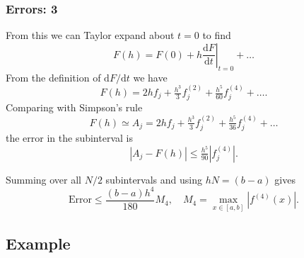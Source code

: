 \documentclass{beamer}
\begin{document}
\begin{frame}
  \frametitle{Errors: 3}

  From this we can Taylor expand about $t=0$ to find
  \begin{equation*}
    F(h) = F(0) + h \left. \frac{\text{d}F}{\text{d}t} \right|_{t=0}
    + \dots
  \end{equation*} \pause
  From the definition of $\text{d}F / \text{d}t$ we have
  \begin{equation*}
    F(h) = 2 h f_j + \tfrac{h^3}{3} f^{(2)}_j + \tfrac{h^5}{60}
    f^{(4)}_j + \dots.
  \end{equation*} \pause
  Comparing with Simpson's rule
  \begin{equation*}
    F(h) \simeq A_j = 2 h f_j + \tfrac{h^3}{3} f^{(2)}_j +
    \tfrac{h^5}{36} f^{(4)}_j + \dots
  \end{equation*}
  the error in the subinterval is
  \begin{equation*}
    | A_j - F(h) | \leq \tfrac{h^5}{90} | f^{(4)}_j |.
  \end{equation*} \pause

  Summing over all $N / 2$ subintervals and using $h N = (b - a)$ gives
  \begin{equation*}
    \text{Error} \leq \frac{(b - a) h^4}{180} M_4, \quad M_4 =
    \max_{x\in[a,b]} | f^{(4)}(x) |.
  \end{equation*}

\end{frame}

\subsection{Example}
\end{document}
